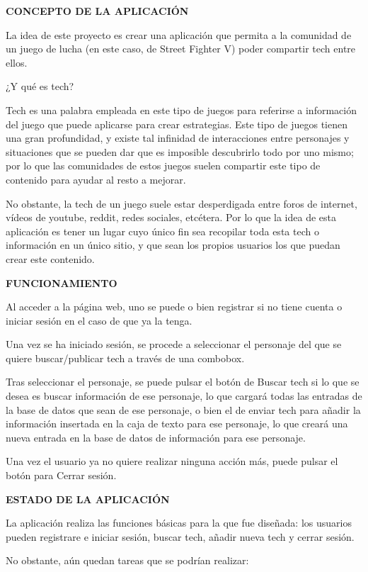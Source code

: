 {\bfseries C\+O\+N\+C\+E\+P\+TO DE LA A\+P\+L\+I\+C\+A\+C\+IÓN}

La idea de este proyecto es crear una aplicación que permita a la comunidad de un juego de lucha (en este caso, de Street Fighter V) poder compartir tech entre ellos.

¿Y qué es tech?

Tech es una palabra empleada en este tipo de juegos para referirse a información del juego que puede aplicarse para crear estrategias. Este tipo de juegos tienen una gran profundidad, y existe tal infinidad de interacciones entre personajes y situaciones que se pueden dar que es imposible descubrirlo todo por uno mismo; por lo que las comunidades de estos juegos suelen compartir este tipo de contenido para ayudar al resto a mejorar.

No obstante, la tech de un juego suele estar desperdigada entre foros de internet, vídeos de youtube, reddit, redes sociales, etcétera. Por lo que la idea de esta aplicación es tener un lugar cuyo único fin sea recopilar toda esta tech o información en un único sitio, y que sean los propios usuarios los que puedan crear este contenido.

{\bfseries F\+U\+N\+C\+I\+O\+N\+A\+M\+I\+E\+N\+TO}

Al acceder a la página web, uno se puede o bien registrar si no tiene cuenta o iniciar sesión en el caso de que ya la tenga.

Una vez se ha iniciado sesión, se procede a seleccionar el personaje del que se quiere buscar/publicar tech a través de una combobox.

Tras seleccionar el personaje, se puede pulsar el botón de Buscar tech si lo que se desea es buscar información de ese personaje, lo que cargará todas las entradas de la base de datos que sean de ese personaje, o bien el de enviar tech para añadir la información insertada en la caja de texto para ese personaje, lo que creará una nueva entrada en la base de datos de información para ese personaje.

Una vez el usuario ya no quiere realizar ninguna acción más, puede pulsar el botón para Cerrar sesión.

{\bfseries E\+S\+T\+A\+DO DE LA A\+P\+L\+I\+C\+A\+C\+IÓN}

La aplicación realiza las funciones básicas para la que fue diseñada\+: los usuarios pueden registrare e iniciar sesión, buscar tech, añadir nueva tech y cerrar sesión.

No obstante, aún quedan tareas que se podrían realizar\+:



